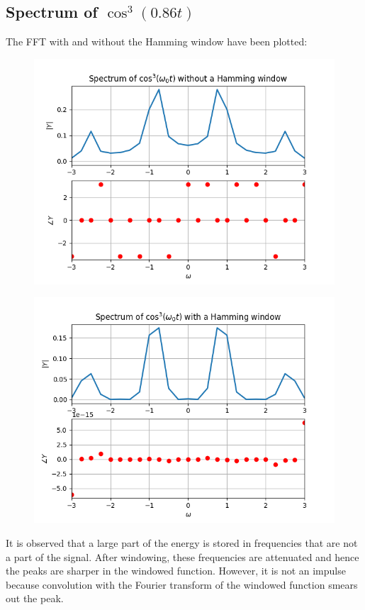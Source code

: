 \documentclass[12pt, a4paper]{article}
\begin{document}
\subsection{Spectrum of $\cos^3(0.86t)$}
The FFT with and without the Hamming window have been plotted:
\begin{figure}[H]
    \centering
    \includegraphics[scale=0.7]{q2a.png}
\end{figure}
\begin{figure}[H]
    \centering
    \includegraphics[scale=0.7]{q2b.png}
\end{figure}
It is observed that a large part of the energy is stored in frequencies that are not a part of the signal.
After windowing, these frequencies are attenuated and hence the peaks are sharper in the windowed function.
However, it is not an impulse because convolution with the Fourier transform of the windowed function smears out the peak.
\end{document}
